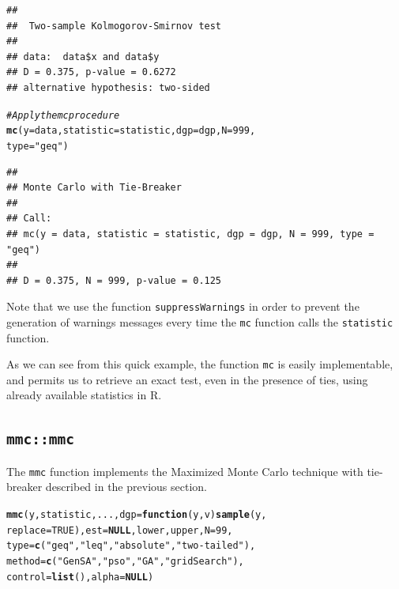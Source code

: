 \documentclass[]{article}\usepackage[]{graphicx}\usepackage[]{color}
\makeatletter
\newcommand{\hlnum}[1]{\textcolor[rgb]{0.686,0.059,0.569}{#1}}%
\newcommand{\hlstr}[1]{\textcolor[rgb]{0.192,0.494,0.8}{#1}}%
\newcommand{\hlcom}[1]{\textcolor[rgb]{0.678,0.584,0.686}{\textit{#1}}}%
\newcommand{\hlstd}[1]{\textcolor[rgb]{0.345,0.345,0.345}{#1}}%
\newcommand{\hlkwa}[1]{\textcolor[rgb]{0.161,0.373,0.58}{\textbf{#1}}}%
\newcommand{\hlkwc}[1]{\textcolor[rgb]{0.333,0.667,0.333}{#1}}%
\newcommand{\hlkwd}[1]{\textcolor[rgb]{0.737,0.353,0.396}{\textbf{#1}}}%
\newenvironment{kframe}{%
 \def\at@end@of@kframe{}%
 \ifinner\ifhmode%
  \def\at@end@of@kframe{\end{minipage}}%
  \begin{minipage}{\columnwidth}%
 \fi\fi%
 \def\FrameCommand##1{\hskip\@totalleftmargin \hskip-\fboxsep
 \colorbox{shadecolor}{##1}\hskip-\fboxsep
     \hskip-\linewidth \hskip-\@totalleftmargin \hskip\columnwidth}%
 \MakeFramed {\advance\hsize-\width
   \@totalleftmargin\z@ \linewidth\hsize
   \@setminipage}}%
 {\par\unskip\endMakeFramed%
 \at@end@of@kframe}
\newenvironment{knitrout}{}{} %
\let\proglang=\textsf
\let\code=\texttt
\makeatother
\begin{document}
\begin{knitrout}
\begin{kframe}
{\ttfamily\noindent\color{warningcolor}{\#\# Warning in ks.test(data\$x, data\$y): cannot compute exact p-value with ties}}\begin{verbatim}
## 
## 	Two-sample Kolmogorov-Smirnov test
## 
## data:  data$x and data$y
## D = 0.375, p-value = 0.6272
## alternative hypothesis: two-sided
\end{verbatim}
\begin{alltt}
\hlcom{# Apply the mc procedure}
\hlkwd{mc}\hlstd{(}\hlkwc{y} \hlstd{= data,} \hlkwc{statistic} \hlstd{= statistic,} \hlkwc{dgp} \hlstd{= dgp,} \hlkwc{N} \hlstd{=} \hlnum{999}\hlstd{,}
    \hlkwc{type} \hlstd{=} \hlstr{"geq"}\hlstd{)}
\end{alltt}
\begin{verbatim}
## 
## Monte Carlo with Tie-Breaker
## 
## Call:
## mc(y = data, statistic = statistic, dgp = dgp, N = 999, type = "geq")
## 
## D = 0.375, N = 999, p-value = 0.125
\end{verbatim}
\end{kframe}
\end{knitrout}

	Note that we use the function \code{suppressWarnings} in order to prevent the generation of warnings messages every time the \code{mc} function calls the \code{statistic} function.

	As we can see from this quick example, the function \code{mc} is easily implementable, and permits us to retrieve an exact test, even in the presence of ties, using already available statistics in \proglang{R}.

\subsection{\code{mmc::mmc}}

The \code{mmc} function implements the Maximized Monte Carlo technique with tie-breaker described in the previous section.
\begin{knitrout}
\color{fgcolor}\begin{kframe}
\begin{alltt}
\hlkwd{mmc}\hlstd{(y, statistic, ...,} \hlkwc{dgp} \hlstd{=} \hlkwa{function}\hlstd{(}\hlkwc{y}\hlstd{,} \hlkwc{v}\hlstd{)} \hlkwd{sample}\hlstd{(y,}
    \hlkwc{replace} \hlstd{=} \hlnum{TRUE}\hlstd{),} \hlkwc{est} \hlstd{=} \hlkwa{NULL}\hlstd{, lower, upper,} \hlkwc{N} \hlstd{=} \hlnum{99}\hlstd{,}
    \hlkwc{type} \hlstd{=} \hlkwd{c}\hlstd{(}\hlstr{"geq"}\hlstd{,} \hlstr{"leq"}\hlstd{,} \hlstr{"absolute"}\hlstd{,} \hlstr{"two-tailed"}\hlstd{),}
    \hlkwc{method} \hlstd{=} \hlkwd{c}\hlstd{(}\hlstr{"GenSA"}\hlstd{,} \hlstr{"pso"}\hlstd{,} \hlstr{"GA"}\hlstd{,} \hlstr{"gridSearch"}\hlstd{),}
    \hlkwc{control} \hlstd{=} \hlkwd{list}\hlstd{(),} \hlkwc{alpha} \hlstd{=} \hlkwa{NULL}\hlstd{)}
\end{alltt}
\end{kframe}
\end{knitrout}
\end{document}
